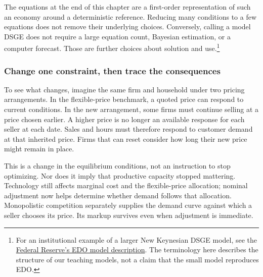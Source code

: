 The equations at the end of this chapter are a first-order representation of
such an economy around a deterministic reference. Reducing many conditions to
a few equations does not remove their underlying choices. Conversely, calling
a model DSGE does not require a large equation count, Bayesian estimation,
or a computer forecast. Those are further choices about solution and use.\footnote{For
an institutional example of a larger New Keynesian DSGE model, see the
\href{https://www.federalreserve.gov/econres/edo-models-about.htm}{Federal Reserve's
EDO model description}. The terminology here describes the structure of our
teaching models, not a claim that the small model reproduces EDO.}

\subsubsection{Change one constraint, then trace the consequences}

To see what changes, imagine the same firm and household under two pricing
arrangements. In the flexible-price benchmark, a quoted price can respond to
current conditions. In the new arrangement, some firms must continue selling
at a price chosen earlier. A higher price is no longer an available response
for each seller at each date. Sales and hours must therefore respond to customer
demand at that inherited price. Firms that can reset consider how long their
new price might remain in place.

This is a change in the equilibrium conditions, not an instruction to stop
optimizing. Nor does it imply that productive capacity stopped mattering.
Technology still affects marginal cost and the flexible-price allocation;
nominal adjustment now helps determine whether demand follows that allocation.
Monopolistic competition separately supplies the demand curve against which a
seller chooses its price. Its markup survives even when adjustment is immediate.

